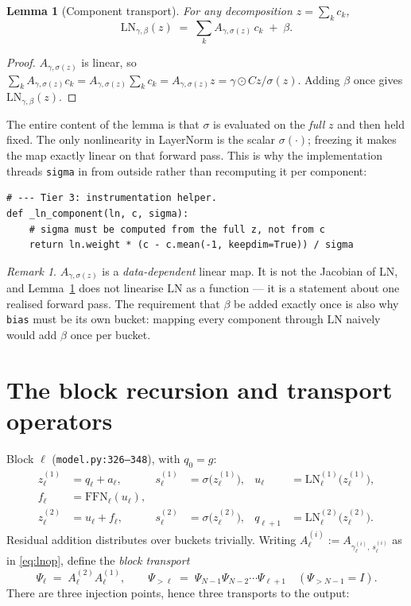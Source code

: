 \documentclass[11pt]{article}
\theoremstyle{plain}
\newtheorem{lemma}{Lemma}
\theoremstyle{remark}
\newtheorem*{remark}{Remark}
\newcommand{\LN}{\mathrm{LN}}
\newcommand{\FFN}{\mathrm{FFN}}
\newcommand{\code}[1]{\texttt{\small #1}}
\begin{document}
\begin{lemma}[Component transport]
\label{lem:ln}
For any decomposition $z = \sum_k c_k$,
\[
  \LN_{\gamma,\beta}(z) \;=\; \sum_k A_{\gamma,\sigma(z)}\, c_k \;+\; \beta .
\]
\end{lemma}

\begin{proof}
$A_{\gamma,\sigma(z)}$ is linear, so
$\sum_k A_{\gamma,\sigma(z)} c_k = A_{\gamma,\sigma(z)} \sum_k c_k
= A_{\gamma,\sigma(z)} z = \gamma \odot Cz / \sigma(z)$. Adding $\beta$ once
gives $\LN_{\gamma,\beta}(z)$.
\end{proof}

\noindent
The entire content of the lemma is that $\sigma$ is evaluated on the
\emph{full} $z$ and then held fixed. The only nonlinearity in LayerNorm is the
scalar $\sigma(\cdot)$; freezing it makes the map exactly linear on that
forward pass. This is why the implementation threads \code{sigma} in from
outside rather than recomputing it per component:

\begin{lstlisting}
# --- Tier 3: instrumentation helper.
def _ln_component(ln, c, sigma):
    # sigma must be computed from the full z, not from c
    return ln.weight * (c - c.mean(-1, keepdim=True)) / sigma
\end{lstlisting}

\begin{remark}
$A_{\gamma,\sigma(z)}$ is a \emph{data-dependent} linear map. It is not the
Jacobian of $\LN$, and Lemma~\ref{lem:ln} does not linearise $\LN$ as a
function --- it is a statement about one realised forward pass. The
requirement that $\beta$ be added exactly once is also why \code{bias} must be
its own bucket: mapping every component through $\LN$ naively would add $\beta$
once per bucket.
\end{remark}

\section{The block recursion and transport operators}

Block $\ell$ (\code{model.py:326--348}), with $q_0 = g$:
\[
\begin{aligned}
  z^{(1)}_\ell &= q_\ell + a_\ell, &
  s^{(1)}_\ell &= \sigma\big(z^{(1)}_\ell\big), &
  u_\ell &= \LN^{(1)}_\ell\big(z^{(1)}_\ell\big), \\[2pt]
  f_\ell &= \FFN_\ell(u_\ell), & & & & \\[2pt]
  z^{(2)}_\ell &= u_\ell + f_\ell, &
  s^{(2)}_\ell &= \sigma\big(z^{(2)}_\ell\big), &
  q_{\ell+1} &= \LN^{(2)}_\ell\big(z^{(2)}_\ell\big).
\end{aligned}
\]
Residual addition distributes over buckets trivially. Writing
$A^{(i)}_\ell := A_{\gamma^{(i)}_\ell,\, s^{(i)}_\ell}$ as in \eqref{eq:lnop},
define the \emph{block transport}
\[
  \Psi_\ell \;=\; A^{(2)}_\ell A^{(1)}_\ell,
  \qquad
  \Psi_{>\ell} \;=\; \Psi_{N-1}\Psi_{N-2}\cdots\Psi_{\ell+1}
  \quad (\Psi_{>N-1} = I).
\]
There are three injection points, hence three transports to the output:
\end{document}
